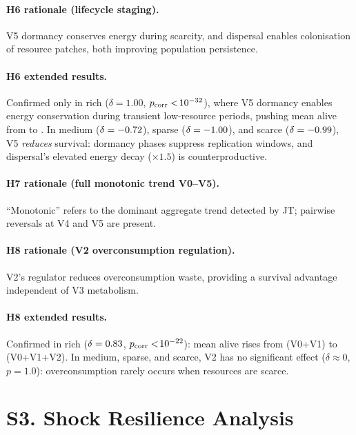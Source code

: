 \documentclass[letterpaper]{article}
\begin{document}
\paragraph{H6 rationale (lifecycle staging).}
V5 dormancy conserves energy during scarcity, and dispersal enables
colonisation of resource patches, both improving population persistence.

\paragraph{H6 extended results.}
Confirmed only in rich ($\delta=1.00$, $p_\text{corr}<\!10^{-32}{}$), where V5
dormancy enables energy conservation during transient low-resource periods,
pushing mean alive from \aliveVzeroToVfourRich{} to \aliveVzeroToVfiveRich{}.
In medium ($\delta=-0.72{}$), sparse
($\delta=-1.00{}$), and scarce
($\delta=-0.99{}$), V5 \emph{reduces} survival: dormancy
phases suppress replication windows, and dispersal's elevated energy decay
($\times 1.5$) is counterproductive.

\paragraph{H7 rationale (full monotonic trend V0--V5).}
``Monotonic'' refers to the dominant aggregate trend detected by JT;
pairwise reversals at V4 and V5 are present.

\paragraph{H8 rationale (V2 overconsumption regulation).}
V2's regulator reduces overconsumption waste, providing a survival advantage
independent of V3 metabolism.

\paragraph{H8 extended results.}
Confirmed in rich ($\delta=0.83{}$,
$p_\text{corr}<\!10^{-22}{}$): mean alive rises from
\aliveVzeroVoneRich{} (V0+V1) to \aliveVzeroVoneVtwoRich{} (V0+V1+V2).
In medium, sparse, and scarce, V2 has no significant effect
($\delta \approx 0$, $p=1.0$): overconsumption rarely occurs when
resources are scarce.

\section*{S3. Shock Resilience Analysis}
\label{sec:s3}
\end{document}
